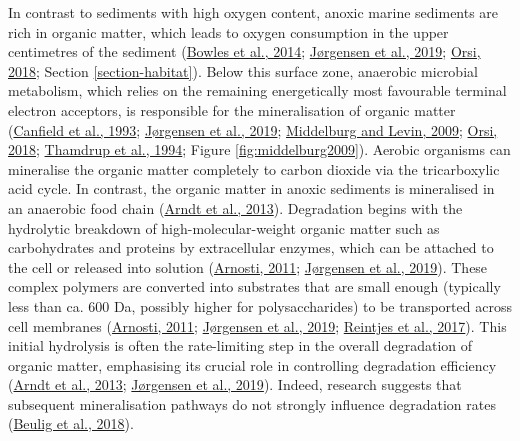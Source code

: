 \documentclass[
  12 pt,
]{book}
\begin{document}
In contrast to sediments with high oxygen content, anoxic marine sediments are rich in organic matter, which leads to oxygen consumption in the upper centimetres of the sediment (\protect\hyperlink{ref-Bowles2014}{Bowles et al., 2014}; \protect\hyperlink{ref-Jorgensen2019}{Jørgensen et al., 2019}; \protect\hyperlink{ref-Orsi2018}{Orsi, 2018}; Section \ref{section-habitat}). Below this surface zone, anaerobic microbial metabolism, which relies on the remaining energetically most favourable terminal electron acceptors, is responsible for the mineralisation of organic matter (\protect\hyperlink{ref-Canfield1993}{Canfield et al., 1993}; \protect\hyperlink{ref-Jorgensen2019}{Jørgensen et al., 2019}; \protect\hyperlink{ref-Middelburg2009}{Middelburg and Levin, 2009}; \protect\hyperlink{ref-Orsi2018}{Orsi, 2018}; \protect\hyperlink{ref-Thamdrup1994}{Thamdrup et al., 1994}; Figure \ref{fig:middelburg2009}). Aerobic organisms can mineralise the organic matter completely to carbon dioxide via the tricarboxylic acid cycle. In contrast, the organic matter in anoxic sediments is mineralised in an anaerobic food chain (\protect\hyperlink{ref-Arndt2013}{Arndt et al., 2013}). Degradation begins with the hydrolytic breakdown of high-molecular-weight organic matter such as carbohydrates and proteins by extracellular enzymes, which can be attached to the cell or released into solution (\protect\hyperlink{ref-Arnosti2011}{Arnosti, 2011}; \protect\hyperlink{ref-Jorgensen2019}{Jørgensen et al., 2019}). These complex polymers are converted into substrates that are small enough (typically less than ca. 600 \si{\dalton}, possibly higher for polysaccharides) to be transported across cell membranes (\protect\hyperlink{ref-Arnosti2011}{Arnosti, 2011}; \protect\hyperlink{ref-Jorgensen2019}{Jørgensen et al., 2019}; \protect\hyperlink{ref-Reintjes2017}{Reintjes et al., 2017}). This initial hydrolysis is often the rate-limiting step in the overall degradation of organic matter, emphasising its crucial role in controlling degradation efficiency (\protect\hyperlink{ref-Arndt2013}{Arndt et al., 2013}; \protect\hyperlink{ref-Jorgensen2019}{Jørgensen et al., 2019}). Indeed, research suggests that subsequent mineralisation pathways do not strongly influence degradation rates (\protect\hyperlink{ref-Beulig2018}{Beulig et al., 2018}).
\end{document}
